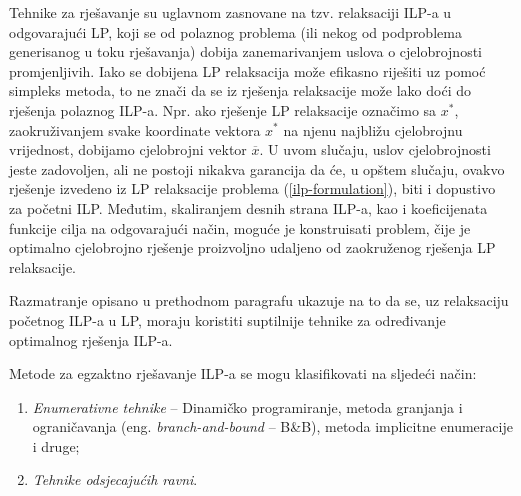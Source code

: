 \documentclass[a4paper, utf8, 11pt, colorlinks]{book}
\theoremstyle{definition}
\begin{document}
Tehnike za rješavanje su uglavnom zasnovane na tzv. relaksaciji ILP-a u odgovarajući LP, koji se od polaznog problema (ili nekog od podproblema generisanog u toku rješavanja) dobija zanemarivanjem uslova o cjelobrojnosti promjenljivih.  Iako se dobijena  LP relaksacija može efikasno riješiti uz pomoć simpleks metoda, to ne znači da se iz rješenja relaksacije može lako doći do rješenja polaznog ILP-a. Npr. ako rješenje LP relaksacije označimo sa $x^*$, zaokruživanjem svake koordinate vektora $x^*$ na njenu najbližu cjelobrojnu vrijednost, dobijamo cjelobrojni vektor  $\overline{x}$.  U uvom slučaju, uslov cjelobrojnosti jeste zadovoljen, ali ne postoji nikakva garancija da će, u opštem slučaju,  ovakvo rješenje izvedeno iz LP relaksacije problema (\ref{ilp-formulation}), biti i  dopustivo za početni ILP. Međutim, skaliranjem desnih strana ILP-a, kao i koeficijenata funkcije cilja na odgovarajući način, moguće je konstruisati problem, čije je optimalno cjelobrojno rješenje proizvoljno udaljeno od zaokruženog rješenja LP relaksacije. 
 
 Razmatranje opisano u prethodnom paragrafu ukazuje na to da se, uz relaksaciju početnog ILP-a u LP, moraju koristiti suptilnije tehnike za određivanje optimalnog rješenja ILP-a. 
 
Metode za egzaktno rješavanje ILP-a se mogu klasifikovati na sljedeći način:
 \begin{enumerate}
     \item \emph{Enumerativne tehnike} -- Dinamičko programiranje, metoda granjanja i ograničavanja (eng. \emph{branch-and-bound} -- B\&B), metoda implicitne enumeracije i druge;
     \item \emph{Tehnike odsjecajućih ravni}.
 \end{enumerate}
\end{document}
